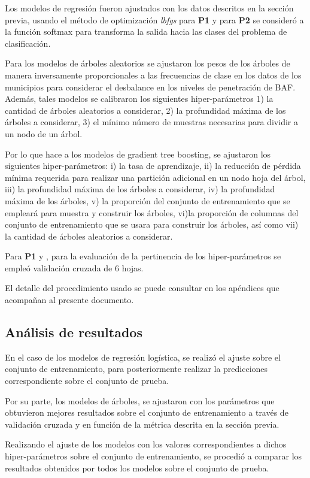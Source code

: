 \documentclass[9pt,twocolumn,twoside]{ilcss}
\begin{document}
Los modelos de regresión fueron ajustados con los datos descritos en la sección previa, usando el método de optimización \emph{lbfgs} para \textbf{P1} y  para \textbf{P2} se consideró a la función softmax para transforma la salida hacia las clases del problema de clasificación.

Para los modelos de árboles aleatorios se ajustaron los pesos de los árboles de manera inversamente proporcionales a las frecuencias de clase en los datos de los municipios para considerar el desbalance en los niveles de penetración de BAF. Además, tales modelos se calibraron los siguientes hiper-parámetros 1) la cantidad de árboles aleatorios a considerar, 2) la profundidad máxima de los árboles a considerar, 3) el mínimo número de muestras necesarias para dividir a un nodo de un árbol.

Por lo que hace a los modelos de gradient tree boosting, se ajustaron los siguientes hiper-parámetros: i) la tasa de aprendizaje,  ii) la reducción de pérdida mínima requerida para realizar una partición adicional en un nodo hoja del árbol, iii) la profundidad máxima de los árboles a considerar, iv) la profundidad máxima de los árboles, v) la proporción del conjunto de entrenamiento que se empleará para muestra y construir los árboles, vi)la proporción de columnas del conjunto de entrenamiento que se usara para construir los árboles, así como vii) la cantidad de árboles aleatorios a considerar.

Para \textbf{P1} y , para la evaluación de la pertinencia de los hiper-parámetros se empleó validación cruzada de 6 hojas.

El detalle del procedimiento usado se puede consultar en los apéndices que acompañan al presente documento.

\subsection{Análisis de resultados}

En el caso de los modelos de regresión logística, se realizó el ajuste sobre el conjunto de entrenamiento, para posteriormente realizar la predicciones correspondiente sobre el conjunto de prueba. 

Por su parte, los modelos de árboles, se ajustaron con los parámetros que obtuvieron mejores resultados sobre el conjunto de entrenamiento a través de validación cruzada y en función de la métrica descrita en la sección previa.

Realizando el ajuste de los modelos con los valores correspondientes a dichos hiper-parámetros sobre el conjunto de entrenamiento, se procedió a comparar los resultados obtenidos por todos los modelos sobre el conjunto de prueba.
\end{document}
